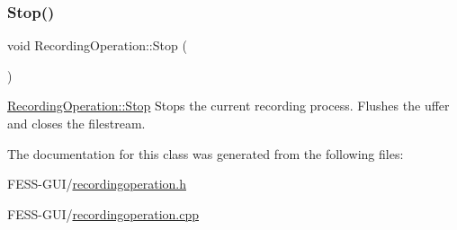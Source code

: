 \subsubsection{\texorpdfstring{Stop()}{Stop()}}
{\footnotesize\ttfamily void Recording\+Operation\+::\+Stop (\begin{DoxyParamCaption}{ }\end{DoxyParamCaption})}



\hyperlink{class_recording_operation_afa9953a7cdce60344d090eb95a4d0d13}{Recording\+Operation\+::\+Stop} Stops the current recording process. Flushes the uffer and closes the filestream. 



The documentation for this class was generated from the following files\+:\begin{DoxyCompactItemize}
\item 
F\+E\+S\+S-\/\+G\+U\+I/\hyperlink{recordingoperation_8h}{recordingoperation.\+h}\item 
F\+E\+S\+S-\/\+G\+U\+I/\hyperlink{recordingoperation_8cpp}{recordingoperation.\+cpp}\end{DoxyCompactItemize}
